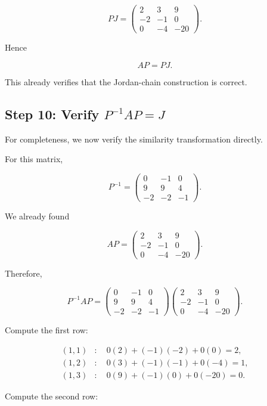 \documentclass[11pt]{article}
\begin{document}
\[
\boxed{
PJ=
\begin{pmatrix}
2&3&9\\
-2&-1&0\\
0&-4&-20
\end{pmatrix}.
}
\]

Hence

\[
\boxed{
AP=PJ.
}
\]

This already verifies that the Jordan-chain construction is correct.


\subsection{Step 10: Verify \(P^{-1}AP=J\)}

For completeness, we now verify the similarity transformation directly.

For this matrix,

\[
P^{-1}
=
\begin{pmatrix}
0&-1&0\\
9&9&4\\
-2&-2&-1
\end{pmatrix}.
\]

We already found

\[
AP=
\begin{pmatrix}
2&3&9\\
-2&-1&0\\
0&-4&-20
\end{pmatrix}.
\]

Therefore,

\[
P^{-1}AP
=
\begin{pmatrix}
0&-1&0\\
9&9&4\\
-2&-2&-1
\end{pmatrix}
\begin{pmatrix}
2&3&9\\
-2&-1&0\\
0&-4&-20
\end{pmatrix}.
\]

Compute the first row:

\[
\begin{aligned}
(1,1)&:\quad 0(2)+(-1)(-2)+0(0)=2,\\
(1,2)&:\quad 0(3)+(-1)(-1)+0(-4)=1,\\
(1,3)&:\quad 0(9)+(-1)(0)+0(-20)=0.
\end{aligned}
\]

Compute the second row:
\end{document}
